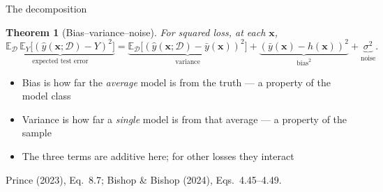 \documentclass[aspectratio=169, 11pt]{beamer}
\newtheorem{thmx}[theorem]{Theorem}
\newcommand{\srcline}[1]{%
  \par\vspace{0.25em}%
  {\scriptsize\color{mcMuted}\hfill #1\par}}
\begin{document}
\begin{frame}{The decomposition}
  \vspace{-0.25em}
  \begin{thmx}[Bias--variance--noise]\label{th:decomp}
    \small
    For squared loss, at each $\mathbf{x}$,
    \[
      \underbrace{\mathbb{E}_{\mathcal{D}}\,\mathbb{E}_{Y}\big[(\hat y(\mathbf{x};\mathcal{D}) - Y)^2\big]}_{\text{expected test error}}
      =
      \underbrace{\mathbb{E}_{\mathcal{D}}\big[(\hat y(\mathbf{x};\mathcal{D}) - \bar y(\mathbf{x}))^2\big]}_{\text{variance}}
      +
      \underbrace{(\bar y(\mathbf{x}) - h(\mathbf{x}))^2}_{\text{bias}^2}
      +
      \underbrace{\sigma^2}_{\text{noise}} .
    \]
  \end{thmx}
  \vspace{0.1em}
  {\footnotesize
  \begin{itemize}\itemsep0.24em
    \item \alert{Bias} is how far the \emph{average} model is from the
          truth --- a property of the model class
    \item \alert{Variance} is how far a \emph{single} model is from that
          average --- a property of the sample
    \item The three terms are additive here; for other losses they
          interact
  \end{itemize}}
  \srcline{Prince (2023), Eq.~8.7; Bishop \& Bishop (2024), Eqs.~4.45--4.49.}
\end{frame}
\end{document}
